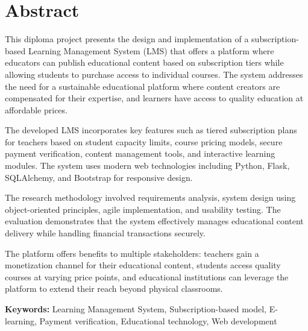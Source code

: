 \newpage
\section*{Abstract}
\thispagestyle{empty}

This diploma project presents the design and implementation of a subscription-based Learning Management System (LMS) that offers a platform where educators can publish educational content based on subscription tiers while allowing students to purchase access to individual courses. The system addresses the need for a sustainable educational platform where content creators are compensated for their expertise, and learners have access to quality education at affordable prices.

The developed LMS incorporates key features such as tiered subscription plans for teachers based on student capacity limits, course pricing models, secure payment verification, content management tools, and interactive learning modules. The system uses modern web technologies including Python, Flask, SQLAlchemy, and Bootstrap for responsive design.

The research methodology involved requirements analysis, system design using object-oriented principles, agile implementation, and usability testing. The evaluation demonstrates that the system effectively manages educational content delivery while handling financial transactions securely.

The platform offers benefits to multiple stakeholders: teachers gain a monetization channel for their educational content, students access quality courses at varying price points, and educational institutions can leverage the platform to extend their reach beyond physical classrooms.

\textbf{Keywords:} Learning Management System, Subscription-based model, E-learning, Payment verification, Educational technology, Web development